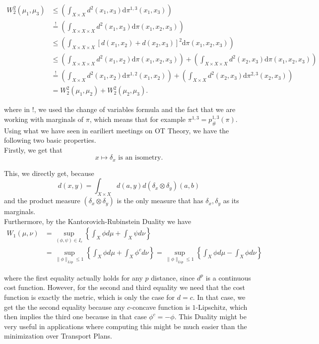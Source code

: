 \documentclass[15pt]{article}
\begin{document}
\begin{align*}W_2^2(\mu_1,\mu_3)
  &\leq\left(\int_{X\times X}d^2(x_1,x_3)\mathrm{d}\pi^{1,3}(x_1,x_3)\right)
  \\&\overset{!}{=}\left(\int_{X\times X\times X}d^2(x_1,x_3)\mathrm{d}\pi(x_1,x_2,x_3)\right)
  \\&\leq \left(\int_{ X\times X\times X}\left[d(x_1,x_2)+d(x_2,x_3)\right]^2\mathrm{d}\pi(x_1,x_2,x_3)\right)
  \\&\leq\left(\int_{X\times X \times X}d^2(x_1,x_2)\mathrm{d}\pi(x_1,x_2,x_3)\right)+\left(\int_{X\times X\times X}d^2(x_2,x_3)\mathrm{d}\pi(x_1,x_2,x_3)\right)
  \\&\overset{!}{=}\left(\int_{X\times X}d^2(x_1,x_2)\mathrm{d}\pi^{1,2}(x_1,x_2)\right)+\left(\int_{X\times X}d^2(x_2,x_3)\mathrm{d}\pi^{2,3}(x_2,x_3)\right)
  \\&=W^2_2(\mu_1,\mu_2)+W_2^2(\mu_2,\mu_3).
\end{align*}

where in !, we used the change of variables formula and the fact that we are working with marginals of $\pi$, which means that for example $\pi^{1,3} = p^{1,3}_{\#}(\pi)$. \\


\newpage
Using what we have seen in eariliert meetings on OT Theory, we have the following two basic properties. \\
Firstly, we get that $$x \mapsto \delta_x \text{ is an isometry.}$$ 

This, we directly get, because $$d(x,y) = \int_{X \times X} d(a,y) d(\delta_x \otimes \delta_y)(a,b)$$ and the product measure $(\delta_x \otimes \delta_y)$ is the only measure that has $\delta_x,\delta_y$ as its marginals. \\

Furthermore, by the Kantorovich-Rubinstein Duality we have \begin{align*} W_1(\mu,\nu) &= \sup_{(\phi,\psi) \in I_c} \left\{ \int_X \phi d\mu + \int_X \psi d\nu \right\} \\ &= \sup_{\|\phi\|_{Lip} \leq 1} \left\{\int_X \phi d\mu + \int_X \phi^c d\nu  \right\} 
   = \sup_{\|\phi\|_{Lip} \leq 1} \left\{\int_X \phi d\mu - \int_X \phi d\nu  \right\} \end{align*}

where the first equality actually holds for any $p$ distance, since $d^p$ is a continuous cost function. 
However, for the second and third equality we need that the cost function is exactly the metric, which is only the case for $d = c$. 
In that case, we get the the second equality because any $c$-concave function is $1$-Lipschitz, which then implies the third one because in that case $\phi^c = -\phi$.
This Duality might be very useful in applications where computing this might be much easier than the minimization over Transport Plans. 
\end{document}
